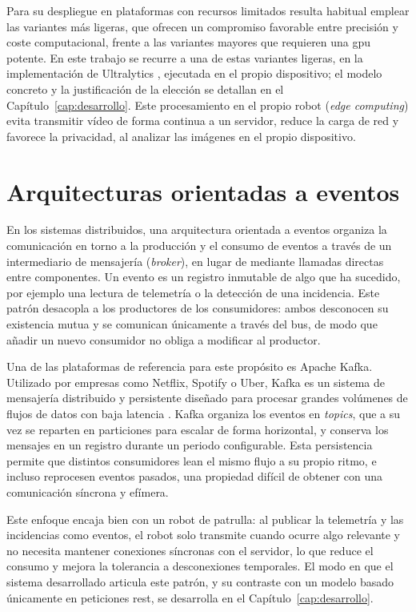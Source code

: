 Para su despliegue en plataformas con recursos limitados resulta habitual emplear
las variantes más ligeras, que ofrecen un compromiso favorable entre precisión y
coste computacional, frente a las variantes mayores que requieren una \acrshort{gpu}
potente. En este trabajo se recurre a una de estas variantes ligeras, en la
implementación de Ultralytics \parencite{jocher2023ultralytics}, ejecutada en el
propio dispositivo; el modelo concreto y la justificación de la elección se detallan
en el Capítulo~\ref{cap:desarrollo}. Este
procesamiento en el propio robot (\textit{edge computing}) evita transmitir vídeo de
forma continua a un servidor, reduce la carga de red y favorece la privacidad, al
analizar las imágenes en el propio dispositivo.

\section{Arquitecturas orientadas a eventos}
\label{sec:arquitecturas-eventos}

En los sistemas distribuidos, una arquitectura orientada a eventos organiza la
comunicación en torno a la producción y el consumo de eventos a través de un
intermediario de mensajería (\textit{broker}), en lugar de mediante llamadas
directas entre componentes. Un evento es un registro inmutable de algo que ha
sucedido, por ejemplo una lectura de telemetría o la detección de una incidencia.
Este patrón desacopla a los productores de los consumidores: ambos desconocen su
existencia mutua y se comunican únicamente a través del bus, de modo que añadir un
nuevo consumidor no obliga a modificar al productor.

Una de las plataformas de referencia para este propósito es Apache Kafka. Utilizado por empresas como Netflix, Spotify o Uber, 
Kafka es un sistema de mensajería distribuido y persistente diseñado para procesar grandes
volúmenes de flujos de datos con baja latencia \parencite{kreps2011kafka}. Kafka
organiza los eventos en \textit{topics}, que a su vez se reparten en particiones
para escalar de forma horizontal, y conserva los mensajes en un registro
durante un periodo configurable. Esta persistencia permite que distintos
consumidores lean el mismo flujo a su propio ritmo, e incluso reprocesen eventos
pasados, una propiedad difícil de obtener con una comunicación síncrona y efímera.

Este enfoque encaja bien con un robot de patrulla: al publicar la telemetría y las
incidencias como eventos, el robot solo transmite cuando ocurre algo relevante y no
necesita mantener conexiones síncronas con el servidor, lo que reduce el consumo y
mejora la tolerancia a desconexiones temporales. El modo en que el sistema
desarrollado articula este patrón, y su contraste con un modelo basado únicamente en
peticiones \gls{rest}, se desarrolla en el Capítulo~\ref{cap:desarrollo}.

